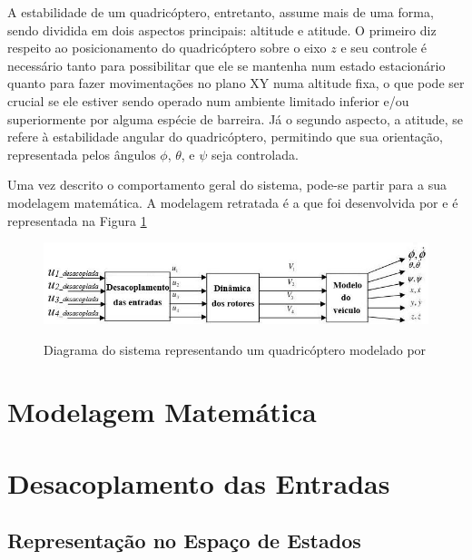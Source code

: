 A estabilidade de um quadricóptero, entretanto, assume mais de uma forma, sendo dividida em dois aspectos principais: altitude e atitude. O primeiro diz respeito ao posicionamento do quadricóptero sobre o eixo $z$ e seu controle é necessário tanto para possibilitar que ele se mantenha num estado estacionário quanto para fazer movimentações no plano XY numa altitude fixa, o que pode ser crucial se ele estiver sendo operado num ambiente limitado inferior e/ou superiormente por alguma espécie de barreira. Já o segundo aspecto, a atitude, se refere à estabilidade angular do quadricóptero, permitindo que sua orientação, representada pelos ângulos $\phi$, $\theta$, e $\psi$ seja controlada.

Uma vez descrito o comportamento geral do sistema, pode-se partir para a sua modelagem matemática. A modelagem retratada é a que foi desenvolvida por  e é representada na Figura \ref{fig:diagrama-quadrotor-balas}

\begin{figure}[!htb]
    \centering
    \caption{Diagrama do sistema representando um quadricóptero modelado por }
    \includegraphics[width=1\textwidth]{./04-figuras/sistemas-nao-lineares/diagrama-quadrotor_traduzido}
    \label{fig:diagrama-quadrotor-balas}
\end{figure}

\section{Modelagem Matemática}
\label{sec:dinamica-rotores}



\section{Desacoplamento das Entradas}
\label{sec:desacoplamento}



%
%


\subsection{Representação no Espaço de Estados}
\label{subsec:quadrotor-ss}



